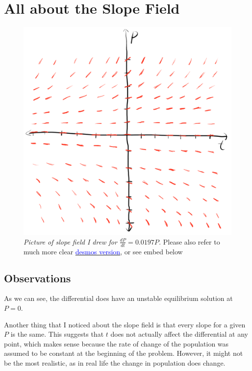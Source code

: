 \documentclass[12pt]{article}
\begin{document}
\section{All about the Slope Field}
\begin{figure}[h]
  \begin{center}
    \includegraphics[scale=2]{disc-3-ankur-res-slope-field.png}
    \caption{\textit{Picture of slope field I drew for $\frac{dP}{dt}=0.0197P$.} Please also refer to much more clear \href{https://www.desmos.com/calculator/8abrp6yuwb}{\textcolor{blue}{desmos version}}, or see embed below}
  \end{center}
\end{figure}
\subsection{Observations}

As we can see, the differential does have an unstable equilibrium solution at $P=0$.

Another thing that I noticed about the slope field is that every slope for a given $P$  is the same. This suggests that $t$ does not actually affect the differential at any point, which makes sense because the rate of change of the population was assumed to be constant at the beginning of the problem. However, it might not be the most realistic, as in real life the change in population does change.
\end{document}
